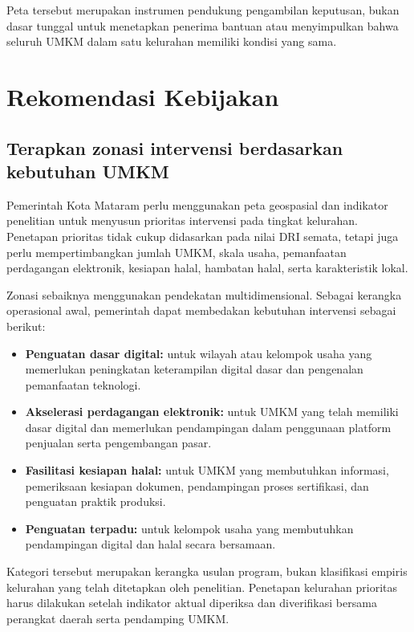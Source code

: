 \documentclass[
  indonesian,
  11pt,
  a4paper,
]{report}
\providecommand{\tightlist}{%
  \setlength{\itemsep}{0pt}\setlength{\parskip}{0pt}}
\begin{document}
Peta tersebut merupakan instrumen pendukung pengambilan keputusan, bukan
dasar tunggal untuk menetapkan penerima bantuan atau menyimpulkan bahwa
seluruh UMKM dalam satu kelurahan memiliki kondisi yang sama.

\chapter*{Rekomendasi Kebijakan}\label{rekomendasi-kebijakan}

\section*{Terapkan zonasi intervensi berdasarkan kebutuhan
UMKM}\label{terapkan-zonasi-intervensi-berdasarkan-kebutuhan-umkm}

Pemerintah Kota Mataram perlu menggunakan peta geospasial dan indikator
penelitian untuk menyusun prioritas intervensi pada tingkat kelurahan.
Penetapan prioritas tidak cukup didasarkan pada nilai DRI semata, tetapi
juga perlu mempertimbangkan jumlah UMKM, skala usaha, pemanfaatan
perdagangan elektronik, kesiapan halal, hambatan halal, serta
karakteristik lokal.

Zonasi sebaiknya menggunakan pendekatan multidimensional. Sebagai
kerangka operasional awal, pemerintah dapat membedakan kebutuhan
intervensi sebagai berikut:

\begin{itemize}
\tightlist
\item
  \textbf{Penguatan dasar digital:} untuk wilayah atau kelompok usaha
  yang memerlukan peningkatan keterampilan digital dasar dan pengenalan
  pemanfaatan teknologi.
\item
  \textbf{Akselerasi perdagangan elektronik:} untuk UMKM yang telah
  memiliki dasar digital dan memerlukan pendampingan dalam penggunaan
  platform penjualan serta pengembangan pasar.
\item
  \textbf{Fasilitasi kesiapan halal:} untuk UMKM yang membutuhkan
  informasi, pemeriksaan kesiapan dokumen, pendampingan proses
  sertifikasi, dan penguatan praktik produksi.
\item
  \textbf{Penguatan terpadu:} untuk kelompok usaha yang membutuhkan
  pendampingan digital dan halal secara bersamaan.
\end{itemize}

Kategori tersebut merupakan kerangka usulan program, bukan klasifikasi
empiris kelurahan yang telah ditetapkan oleh penelitian. Penetapan
kelurahan prioritas harus dilakukan setelah indikator aktual diperiksa
dan diverifikasi bersama perangkat daerah serta pendamping UMKM.
\end{document}
